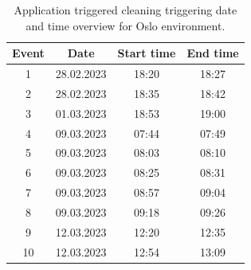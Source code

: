 \begin{table}[H]
\centering
\caption{Application triggered cleaning triggering date and time overview for Oslo environment.}
\label{tab:ATC_dateandtimeOslo}
\begin{tabular}{|c|c|c|c|}
\hline
\textbf{Event} & \textbf{Date} & \textbf{Start time} & \textbf{End time} \\ \hline
1              & 28.02.2023         & 18:20               & 18:27             \\ \hline
2              & 28.02.2023         & 18:35               & 18:42             \\ \hline
3              & 01.03.2023         & 18:53               & 19:00             \\ \hline
4              & 09.03.2023         & 07:44               & 07:49             \\ \hline
5              & 09.03.2023         & 08:03               & 08:10             \\ \hline
6              & 09.03.2023         & 08:25               & 08:31             \\ \hline
7              & 09.03.2023         & 08:57               & 09:04             \\ \hline
8              & 09.03.2023         & 09:18               & 09:26             \\ \hline
9              & 12.03.2023         & 12:20               & 12:35             \\ \hline
10             & 12.03.2023         & 12:54               & 13:09             \\ \hline
\end{tabular}
\end{table}


